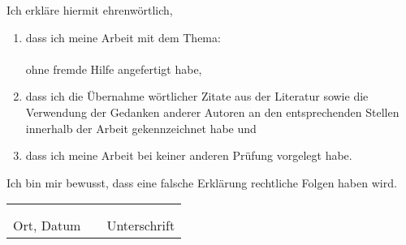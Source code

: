 Ich erkläre hiermit ehrenwörtlich,
\begin{flushleft}
\begin{enumerate}[leftmargin=0.5cm]
	\item 	dass ich meine Arbeit
	mit dem Thema:  \\
	\vspace*{1cm}
			\textbf{\CTITLE} \\
	\vspace*{1cm}
			ohne fremde Hilfe angefertigt habe, \\
	\item	dass ich die Übernahme wörtlicher Zitate aus der Literatur sowie die Verwendung der
			Gedanken anderer Autoren an den entsprechenden Stellen innerhalb der Arbeit gekennzeichnet habe und  \\
	\item	dass ich meine Arbeit
	bei keiner anderen Prüfung vorgelegt habe. \\
	\vspace*{1cm}
\end{enumerate}
\noindent
Ich bin mir bewusst, dass eine falsche Erklärung rechtliche Folgen haben wird.
\end{flushleft}
\vspace*{\fill}
\begin{tabular} {lrl}
	\hspace{5.5cm} & \hspace{3cm} & \hspace{5.5cm} \\
	\hrulefill & & \hrulefill \\
	Ort, Datum & & Unterschrift
\end{tabular}
\vspace*{\fill}

\cleardoublepage
